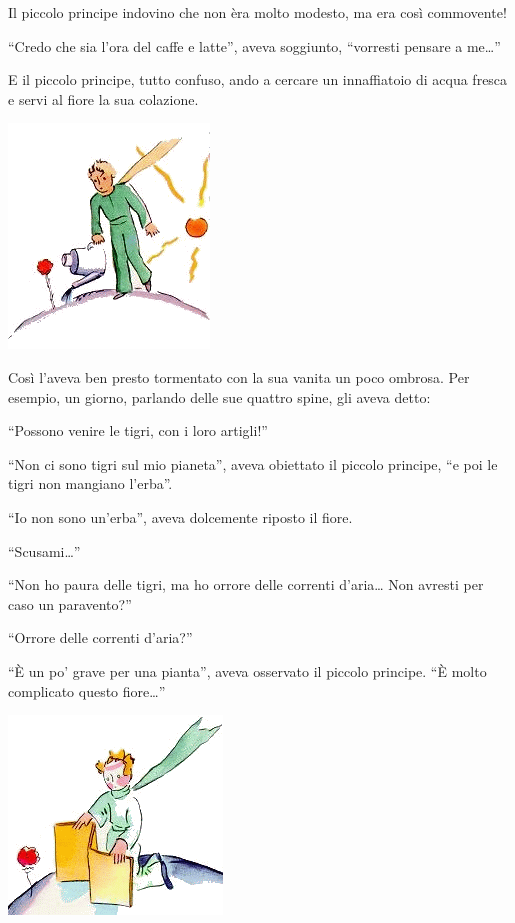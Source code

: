 \documentclass[11pt]{scrbook}
\begin{document}
Il piccolo principe indovino che non èra molto modesto, ma era così
commovente!

``Credo che sia l'ora del caffe e latte'', aveva soggiunto, ``vorresti
pensare a me\ldots{}''

E il piccolo principe, tutto confuso, ando a cercare un innaffiatoio di
acqua fresca e servi al fiore la sua colazione.

\begin{center}
\includegraphics{img/8b}
\end{center}

Così l'aveva ben presto tormentato con la sua vanita un poco ombrosa.
Per esempio, un giorno, parlando delle sue quattro spine, gli aveva
detto:

``Possono venire le tigri, con i loro artigli!''

``Non ci sono tigri sul mio pianeta'', aveva obiettato il piccolo
principe, ``e poi le tigri non mangiano l'erba''.

``Io non sono un'erba'', aveva dolcemente riposto il fiore.

``Scusami\ldots{}''

``Non ho paura delle tigri, ma ho orrore delle correnti d'aria\ldots{}
Non avresti per caso un paravento?''

``Orrore delle correnti d'aria?''

``È un po' grave per una pianta'', aveva osservato il piccolo principe.
``È molto complicato questo fiore\ldots{}''

\begin{center}
\includegraphics{img/8c}
\end{center}
\end{document}
